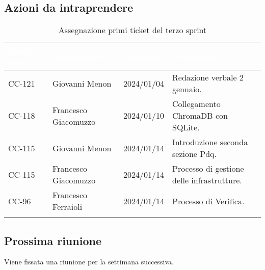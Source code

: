 \subsection{Azioni da intraprendere}
{
    \setlength{\tabcolsep}{10pt}
            \renewcommand{\arraystretch}{1.5}
            \begin{xltabular}{\textwidth}{| l | X | l | X |}
                 \hline
                 \textbf{\textcolor{white}{Codice issue}} & \textbf{\textcolor{white}{Assegnatario}} & \textbf{\textcolor{white}{Scadenza}} & \textbf{\textcolor{white}{Descrizione}} \\
                 \hline
                 \endhead
                 CC-121 & Giovanni Menon & 2024/01/04 & Redazione verbale 2 gennaio. \\
                 \hline
                 CC-118 & Francesco Giacomuzzo & 2024/01/10 & Collegamento ChromaDB con SQLite.  \\
                 \hline
                 CC-115 & Giovanni Menon & 2024/01/14 & Introduzione seconda sezione Pdq. \\
                 \hline
                 CC-115 & Francesco Giacomuzzo & 2024/01/14 & Processo di gestione delle infrastrutture. \\
                 \hline
                 CC-96 & Francesco Ferraioli & 2024/01/14 & Processo di Verifica. \\
                 \hline
                  \caption{Assegnazione primi ticket del terzo sprint}
            \end{xltabular}
}


\subsection{Prossima riunione} \label{subsec:riunione}
Viene fissata una riunione per la settimana successiva.